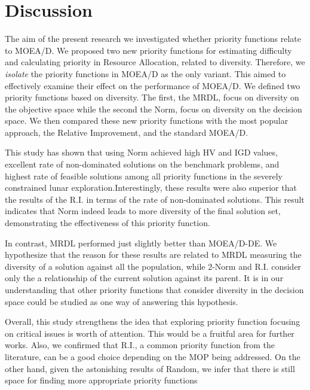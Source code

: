 \section{Discussion}
The aim of the present research we investigated whether priority functions relate to MOEA/D.
We proposed two new priority functions for estimating difficulty and calculating priority in Resource Allocation, related to diversity. Therefore, we \emph{isolate} the priority functions in MOEA/D as the only variant. This aimed to effectively examine their effect on the performance of MOEA/D. We defined two priority functions based on diversity. The first, the MRDL, focus on diversity on the objective space while the second the Norm,  focus on diversity on the decision space. We then compared these new priority functions with the most popular approach, the Relative Improvement, and the standard MOEA/D.

This study has shown that using Norm achieved high HV and IGD values, excellent rate of non-dominated solutions on the benchmark problems, and highest rate of feasible solutions among all priority functions in the severely constrained lunar exploration.Interestingly, these results were also superior that the results of the R.I. in terms of the rate of non-dominated solutions. This result indicates that Norm indeed leads to more diversity of the final solution set, demonstrating the effectiveness of this priority function. 

In contrast, MRDL performed just slightly better than MOEA/D-DE. We hypothesize that the reason for these results are related to MRDL measuring the diversity of a solution against all the population, while 2-Norm and R.I. consider only the a relationship of the current solution against its parent. It is in our understanding that other priority functions that consider diversity in the decision space could be studied as one way of answering this hypothesis. 
 
 Overall, this study strengthens the idea that exploring priority function focusing on critical issues is worth of attention. This would be a fruitful area for further works. Also, we confirmed that R.I., a common priority function from the literature, can be a good choice depending on the MOP being addressed. On the other hand, given the astonishing results of Random, we infer that there is still space for finding more appropriate priority functions
 
